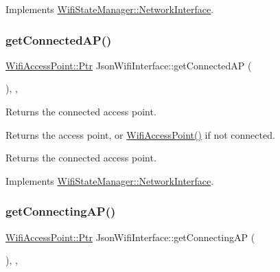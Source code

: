 Implements \mbox{\hyperlink{classWifiStateManager_1_1NetworkInterface_a276f17f2d4aa943e9781dcc1b5e93e54}{Wifi\+State\+Manager\+::\+Network\+Interface}}.

\mbox{\label{classJsonWifiInterface_a9c42aee1d88451e199646732f60e125a}} 
\subsubsection{\texorpdfstring{get\+Connected\+A\+P()}{getConnectedAP()}}
{\footnotesize\ttfamily \mbox{\hyperlink{classWifiAccessPoint_ad18977f884076774803027efbaa131a0}{Wifi\+Access\+Point\+::\+Ptr}} Json\+Wifi\+Interface\+::get\+Connected\+AP (\begin{DoxyParamCaption}{ }\end{DoxyParamCaption})\hspace{0.3cm}{\ttfamily [override]}, {\ttfamily [protected]}, {\ttfamily [virtual]}}

Returns the connected access point.

\begin{DoxyReturn}{Returns}
the access point, or \mbox{\hyperlink{classWifiAccessPoint}{Wifi\+Access\+Point()}} if not connected.
\end{DoxyReturn}
Returns the connected access point. 

Implements \mbox{\hyperlink{classWifiStateManager_1_1NetworkInterface_a924f90089b1d0a64771b904bc96ce81a}{Wifi\+State\+Manager\+::\+Network\+Interface}}.

\mbox{\label{classJsonWifiInterface_a16cf46edd6f175f1217f6b341651b18d}} 
\subsubsection{\texorpdfstring{get\+Connecting\+A\+P()}{getConnectingAP()}}
{\footnotesize\ttfamily \mbox{\hyperlink{classWifiAccessPoint_ad18977f884076774803027efbaa131a0}{Wifi\+Access\+Point\+::\+Ptr}} Json\+Wifi\+Interface\+::get\+Connecting\+AP (\begin{DoxyParamCaption}{ }\end{DoxyParamCaption})\hspace{0.3cm}{\ttfamily [override]}, {\ttfamily [protected]}, {\ttfamily [virtual]}}

